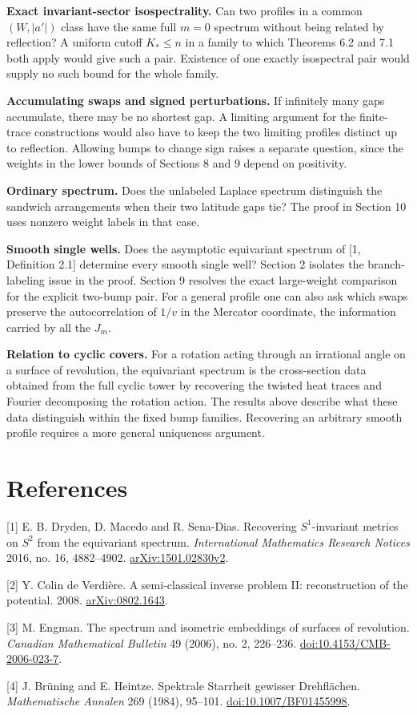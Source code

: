 \documentclass[11pt,letterpaper]{article}
\begin{document}
\textbf{Exact invariant-sector isospectrality.} Can two profiles in a common \((W,|a'|)\)
class have the same full \(m=0\) spectrum without being related by reflection? A uniform
cutoff \(K_*\le n\) in a family to which Theorems 6.2 and 7.1 both apply would give such a
pair. Existence of one exactly isospectral pair would supply no such bound for the whole
family.

\textbf{Accumulating swaps and signed perturbations.} If infinitely many gaps accumulate,
there may be no shortest gap. A limiting argument for the finite-trace constructions would
also have to keep the two limiting profiles distinct up to reflection. Allowing bumps to
change sign raises a separate question, since the weights in the lower bounds of Sections 8
and 9 depend on positivity.

\textbf{Ordinary spectrum.} Does the unlabeled Laplace spectrum distinguish the sandwich
arrangements when their two latitude gaps tie? The proof in Section 10 uses nonzero weight
labels in that case.

\textbf{Smooth single wells.} Does the asymptotic equivariant spectrum of [1, Definition
2.1] determine every smooth single well? Section 2 isolates the branch-labeling issue in
the proof. Section 9 resolves the exact large-weight comparison for the explicit two-bump
pair. For a general profile one can also ask which swaps preserve the autocorrelation of
\(1/v\) in the Mercator coordinate, the information carried by all the \(J_m\).

\textbf{Relation to cyclic covers.} For a rotation acting through an irrational angle on a
surface of revolution, the equivariant spectrum is the cross-section data obtained from the
full cyclic tower by recovering the twisted heat traces and Fourier decomposing the rotation
action. The results above describe what these data distinguish within the fixed bump
families. Recovering an arbitrary smooth profile requires a more general uniqueness
argument.

\section{References}\label{references}

[1] E. B. Dryden, D. Macedo and R. Sena-Dias. Recovering \(S^1\)-invariant metrics on
\(S^2\) from the equivariant spectrum. \emph{International Mathematics Research Notices}
2016, no. 16, 4882--4902. \href{https://arxiv.org/abs/1501.02830v2}{arXiv:1501.02830v2}.

[2] Y. Colin de Verdière. A semi-classical inverse problem II: reconstruction of the
potential. 2008. \href{https://arxiv.org/abs/0802.1643}{arXiv:0802.1643}.

[3] M. Engman. The spectrum and isometric embeddings of surfaces of revolution.
\emph{Canadian Mathematical Bulletin} 49 (2006), no. 2, 226--236.
\href{https://doi.org/10.4153/CMB-2006-023-7}{doi:10.4153/CMB-2006-023-7}.

[4] J. Brüning and E. Heintze. Spektrale Starrheit gewisser Drehflächen.
\emph{Mathematische Annalen} 269 (1984), 95--101.
\href{https://doi.org/10.1007/BF01455998}{doi:10.1007/BF01455998}.
\end{document}
